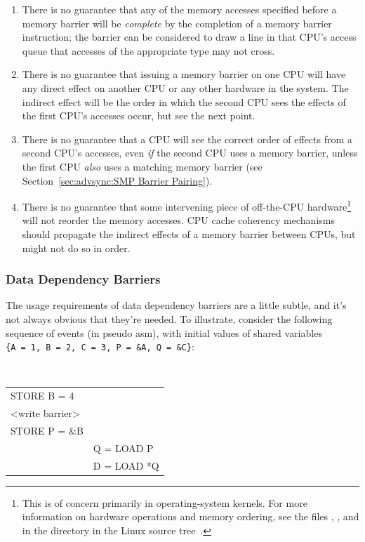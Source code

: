 \begin{enumerate}
\item	There is no guarantee that any of the memory accesses specified
	before a memory barrier will be \emph{complete} by the completion
	of a memory barrier instruction; the barrier can be considered
	to draw a line in that CPU's access queue that accesses of the
	appropriate type may not cross.
\item	There is no guarantee that issuing a memory barrier on one CPU
	will have any direct effect on another CPU or any other hardware
	in the system.	The indirect effect will be the order in which
	the second CPU sees the effects of the first CPU's accesses occur,
	but see the next point.
\item	There is no guarantee that a CPU will see the correct order
	of effects from a second CPU's accesses, even \emph{if} the second CPU
	uses a memory barrier, unless the first CPU \emph{also} uses a matching
	memory barrier (see
	Section~\ref{sec:advsync:SMP Barrier Pairing}).
\item	There is no guarantee that some intervening piece of off-the-CPU
	hardware\footnote{
		This is of concern primarily in operating-system kernels.
		For more information on hardware operations and memory
		ordering, see the files , ,
		and  in the  directory in
		the Linux source tree~\cite{Torvalds2.6kernel}.}
	will not reorder the memory accesses.  CPU cache
	coherency mechanisms should propagate the indirect effects of
	a memory barrier between CPUs, but might not do so in order.
\end{enumerate}

\subsubsection{Data Dependency Barriers}
\label{sec:advsync:Data Dependency Barriers}

The usage requirements of data dependency barriers are a little subtle, and
it's not always obvious that they're needed.  To illustrate, consider the
following sequence of events (in pseudo asm), with initial values of shared
variables
{\tt \{A~=~1, B~=~2, C~=~3, P~=~\&A, Q~=~\&C\}}:

\vspace{5pt}
\begin{minipage}[t]{\columnwidth}
\tt
\scriptsize
\begin{tabular}{l|l}
	\nf{CPU 1}	& \nf{CPU 2} \\
	\hline
	STORE B = 4	& \\
	<write barrier>	& \\
	STORE P = \&B	& \\
			& Q = LOAD P \\
			& D = LOAD *Q \\
\end{tabular}
\end{minipage}
\vspace{5pt}

